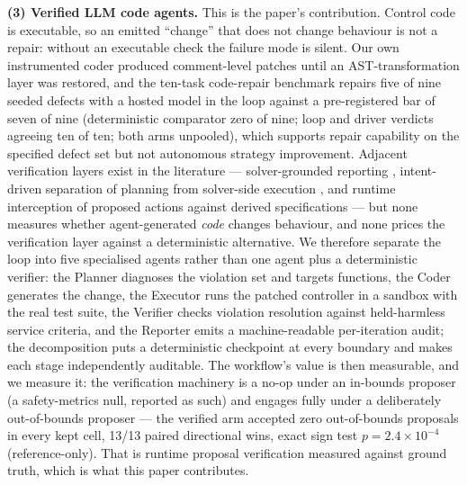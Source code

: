 \documentclass[11pt,a4paper]{article}
\begin{document}
\textbf{(3) Verified LLM code agents.} This is the paper's contribution.
Control code is executable, so an emitted ``change'' that does not change
behaviour is not a repair: without an executable check the failure mode is
silent. Our own instrumented coder produced comment-level patches until an
AST-transformation layer was restored, and the ten-task code-repair benchmark
repairs five of nine seeded defects with a hosted model in the loop against a
pre-registered bar of seven of nine (deterministic comparator zero of nine;
loop and driver verdicts agreeing ten of ten; both arms unpooled), which
supports repair capability on the specified defect set but not autonomous
strategy improvement. Adjacent verification layers exist in the
literature --- solver-grounded reporting \cite{rojas2026smartgridllm},
intent-driven separation of planning from solver-side execution
\cite{mao2026intent}, and runtime interception of proposed actions against
derived specifications \cite{batole2026refineact} --- but none measures whether
agent-generated \emph{code} changes behaviour, and none prices the
verification layer against a deterministic alternative. We therefore separate
the loop into five specialised agents rather than one agent plus a
deterministic verifier: the Planner diagnoses the violation set and targets
functions, the Coder generates the change, the Executor runs the patched
controller in a sandbox with the real test suite, the Verifier checks violation
resolution against held-harmless service criteria, and the Reporter emits a
machine-readable per-iteration audit; the decomposition puts a deterministic
checkpoint at every boundary and makes each stage independently auditable. The
workflow's value is then measurable, and we measure it: the verification
machinery is a no-op under an in-bounds proposer (a safety-metrics null,
reported as such) and engages fully under a deliberately out-of-bounds
proposer --- the verified arm accepted zero out-of-bounds proposals in every
kept cell, 13/13 paired directional wins, exact sign test $p = 2.4 \times
10^{-4}$ (reference-only). That is runtime proposal verification measured
against ground truth, which is what this paper contributes.
\end{document}
